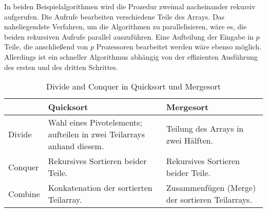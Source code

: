 In beiden Beispielalgorithmen wird die Prozedur zweimal nacheinander rekursiv
aufgerufen.
Die Aufrufe bearbeiten verschiedene Teile des Arrays.
Das naheliegendste Verfahren, um die Algorithmen zu parallelisieren, wäre es,
die beiden rekursiven Aufrufe parallel auszuführen.
Eine Aufteilung der Eingabe in $p$ Teile, die anschließend von $p$ Prozessoren
bearbeitet werden wäre ebenso möglich.
Allerdings ist ein schneller Algorithmus abhängig von der effizienten Ausführung
des ersten und des dritten Schrittes.
\cite[S.30ff.]{cormen}
\cite[S.56ff.]{jaja}

\begin{table}
    \centering
    \begin{tabularx}{\textwidth}{|l|X|X|}
        \hline
        & Quicksort & Mergesort \\ \hline
        Divide  &
        Wahl eines Pivotelements; \newline
        aufteilen in zwei Teilarrays anhand diesem. &
        Teilung des Arrays in zwei Hälften. \\
        \hline
        Conquer &
        Rekursives Sortieren beider Teile. &
        Rekursives Sortieren beider Teile. \\
        \hline
        Combine &
        Konkatenation der sortierten Teilarray. &
        Zusammenfügen (Merge) der sortieren Teilarrays. \\
        \hline
    \end{tabularx}
    \caption{Divide and Conquer in Quicksort und Mergesort}
    \label{tab:dac}
\end{table}

